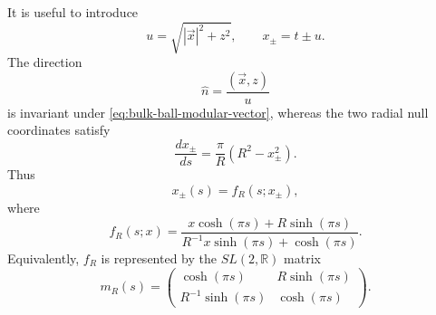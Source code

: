 \documentclass[a4paper,11pt]{article}
\theoremstyle{definition}
\begin{document}
It is useful to introduce
\begin{equation}
    u
    =
    \sqrt{|\vec{x}|^2+z^2},
    \qquad
    x_\pm=t\pm u.
\end{equation}
The direction
\begin{equation}
    \widehat n
    =
    \frac{(\vec{x},z)}{u}
\end{equation}
is invariant under \eqref{eq:bulk-ball-modular-vector}, whereas the two
radial null coordinates satisfy
\begin{equation}
    \frac{d x_\pm}{ds}
    =
    \frac{\pi}{R}
    \left(R^2-x_\pm^2\right).
\end{equation}
Thus
\begin{equation}
    x_\pm(s)=f_R(s;x_\pm),
    \label{eq:ball-bulk-flow-null}
\end{equation}
where
\begin{equation}
    f_R(s;x)
    =
    \frac{
        x\cosh(\pi s)+R\sinh(\pi s)
    }{
        R^{-1}x\sinh(\pi s)+\cosh(\pi s)
    }.
    \label{eq:fR-def}
\end{equation}
Equivalently, $f_R$ is represented by the $SL(2,\mathbb R)$ matrix
\begin{equation}
    m_R(s)
    =
    \begin{pmatrix}
        \cosh(\pi s) & R\sinh(\pi s)\\[1mm]
        R^{-1}\sinh(\pi s) & \cosh(\pi s)
    \end{pmatrix}.
    \label{eq:mR-modular}
\end{equation}
\end{document}
